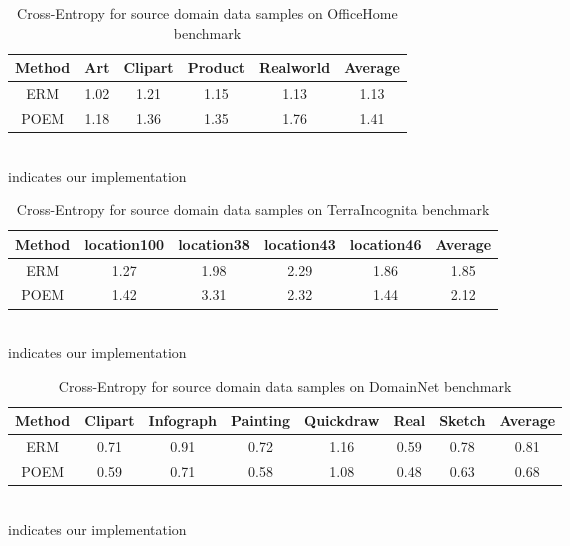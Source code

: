 \documentclass[letterpaper]{article} \usepackage{aaai23}  \usepackage{times}  \usepackage{helvet}  \usepackage{courier}  \usepackage[hyphens]{url}  \usepackage{graphicx} \urlstyle{rm} \def\UrlFont{\rm}  \usepackage{natbib}  \usepackage{caption} \frenchspacing  \setlength{\pdfpagewidth}{8.5in}  \setlength{\pdfpageheight}{11in}  \usepackage[labelsep=period]{caption}
\begin{document}
\begin{table}[H]
\centering
	\begin{tabular}{ccccc|c}
		\toprule
		\textbf{Method} & Art & Clipart & Product & Realworld & Average\\
		\midrule
		ERM & 1.02 & 1.21 & 1.15 & 1.13 & 1.13\\
		POEM & 1.18 & 1.36 & 1.35 & 1.76 & 1.41\\
		\hline
	\end{tabular}
	\label{tab:CE_OH}
	\footnotesize{\\ indicates our implementation}\\
        \caption{Cross-Entropy for source domain data samples on OfficeHome benchmark}
\end{table}	


\begin{table}[H]
\centering
	\begin{tabular}{ccccc|c}
		\toprule
		\textbf{Method} & location100 & location38 & location43 & location46 & Average\\
		\midrule
		ERM & 1.27 & 1.98 & 2.29 & 1.86 & 1.85\\
		POEM & 1.42 & 3.31 & 2.32 & 1.44 & 2.12\\
		\hline
	\end{tabular}
	\label{tab:CE_Terra}
	\footnotesize{\\ indicates our implementation}\\
        \caption{Cross-Entropy for source domain data samples on TerraIncognita benchmark}
\end{table}	

\begin{table}[H]
\centering
	\begin{tabular}{ccccccc|c}
		\toprule
		\textbf{Method} & Clipart & Infograph & Painting & Quickdraw & Real & Sketch & Average\\
		\midrule
		ERM & 0.71 & 0.91 & 0.72 & 1.16 & 0.59 & 0.78 & 0.81 \\
		POEM & 0.59 & 0.71 & 0.58 & 1.08 & 0.48 & 0.63 & 0.68 \\
		\hline
	\end{tabular}
	\footnotesize{\\ indicates our implementation}\\
        \caption{Cross-Entropy for source domain data samples on DomainNet benchmark}
        \label{tab:CE_DN}
\end{table}	
\end{document}
